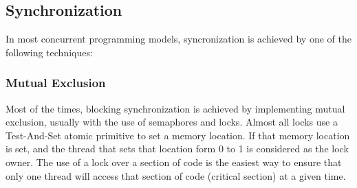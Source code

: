 

 
%
%
%
%
%

\subsection{Synchronization}
In most concurrent programming models, syncronization is achieved by one of the following techniques:

\subsubsection{Mutual Exclusion}

Most of the times, blocking synchronization is achieved  by implementing  mutual exclusion, usually with the use of semaphores and locks. Almost all locks use a Test-And-Set atomic primitive to set a memory location. If that memory location is set,  and the thread that sets that location form 0 to 1 is considered as the lock owner. The use of a lock over a section of code is the easiest way to ensure that only one thread will access that section of code (critical section) at a given time.

